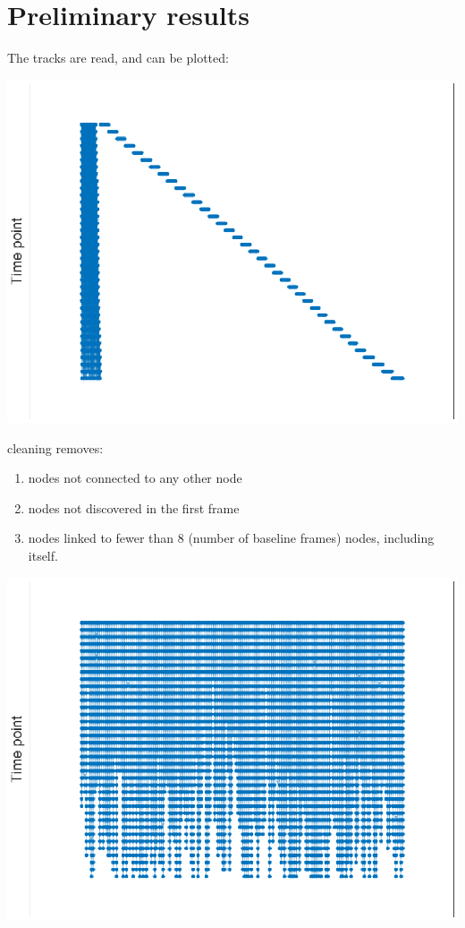 \documentclass[11pt]{article}
\begin{document}
\section{Preliminary results}
\label{sec:org3b1898c}
The tracks are read, and can be plotted: 
\begin{center}
\includegraphics[width=.9\linewidth]{./uncleaned_graph.eps}
\end{center}
cleaning removes:
\begin{enumerate}
\item nodes not connected to any other node
\item nodes not discovered in the first frame
\item nodes linked to fewer than 8 (number of baseline frames) nodes, including itself.
\end{enumerate}
\begin{center}
\includegraphics[width=.9\linewidth]{./cleaned_graph.eps}
\end{center}
\end{document}

